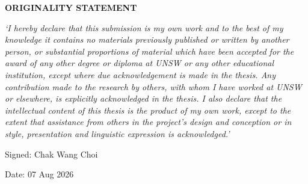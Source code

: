 \noindent \textbf{ORIGINALITY STATEMENT}

\vspace{0.5cm}

\textit{‘I hereby declare that this submission is my own work and to the best of my knowledge it contains no materials previously published or written by another person, or substantial proportions of material which have been accepted for the award of any other degree or diploma at UNSW or any other educational institution, except where due acknowledgement is made in the thesis. Any contribution made to the research by others, with whom I have worked at UNSW or elsewhere, is explicitly acknowledged in the thesis. I also declare that the intellectual content of this thesis is the product of my own work, except to the extent that assistance from others in the project's design and conception or in style, presentation and linguistic expression is acknowledged.’}

\vspace{0.5cm}

Signed: Chak Wang Choi

Date: 07 Aug 2026
